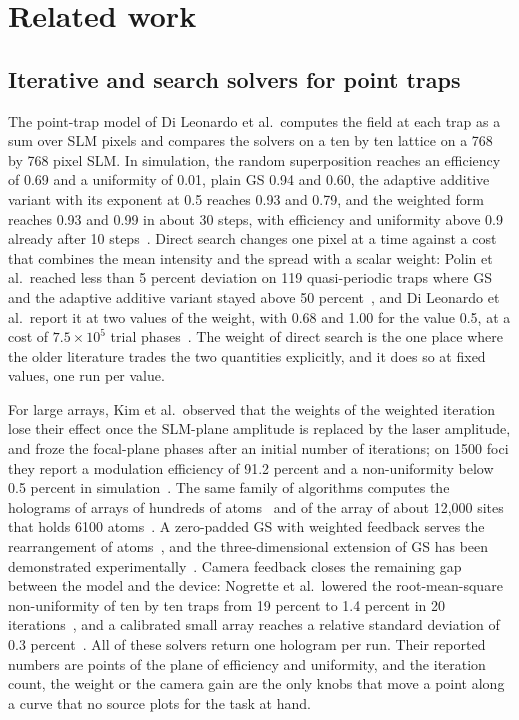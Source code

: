 \section{Related work}\label{sec:related}

\subsection{Iterative and search solvers for point traps}

The point-trap model of Di Leonardo et al.\ computes the field at each trap as a sum over SLM pixels and compares the solvers on a ten by ten lattice on a 768 by 768 pixel SLM. In simulation,
the random superposition reaches an efficiency of 0.69 and a uniformity of 0.01, plain GS 0.94 and 0.60, the adaptive additive variant with its exponent at 0.5 reaches 0.93 and 0.79, and the weighted form reaches 0.93 and 0.99 in about 30 steps,
with efficiency and uniformity above 0.9 already after 10 steps~\cite{dileonardo}. Direct search changes one pixel at a time against a cost that combines the mean intensity and the spread with a scalar weight: Polin et al.\ reached less than 5 percent deviation
on 119 quasi-periodic traps where GS and the adaptive additive variant stayed above 50 percent~\cite{polin}, and Di Leonardo et al.\ report it at two values of the weight, with 0.68 and 1.00 for the value 0.5, at a cost of $7.5\times10^{5}$ trial phases~\cite{dileonardo}.
The weight of direct search is the one place where the older literature trades the two quantities explicitly, and it does so at fixed values, one run per value.

For large arrays, Kim et al.\ observed that the weights of the weighted iteration lose their effect once the SLM-plane amplitude is replaced by the laser amplitude, and froze the focal-plane phases after an initial number of iterations; on 1500 foci they
report a modulation efficiency of 91.2 percent and a non-uniformity below 0.5 percent in simulation~\cite{kim2019}. The same family of algorithms computes the holograms of arrays of hundreds of atoms~\cite{ebadi} and of the array of about 12,000 sites that holds 6100 atoms~\cite{manetsch}.
A zero-padded GS with weighted feedback serves the rearrangement of atoms~\cite{kimoe2019}, and the three-dimensional extension of GS has been demonstrated experimentally~\cite{whyte}. Camera feedback closes the remaining gap between the model and the device:
Nogrette et al.\ lowered the root-mean-square non-uniformity of ten by ten traps from 19 percent to 1.4 percent in 20 iterations~\cite{nogrette}, and a calibrated small array reaches a relative standard deviation of 0.3 percent~\cite{chew}. All of these solvers
return one hologram per run. Their reported numbers are points of the plane of efficiency and uniformity, and the iteration count, the weight or the camera gain are the only knobs that move a point along a curve that no source plots for the task at hand.

